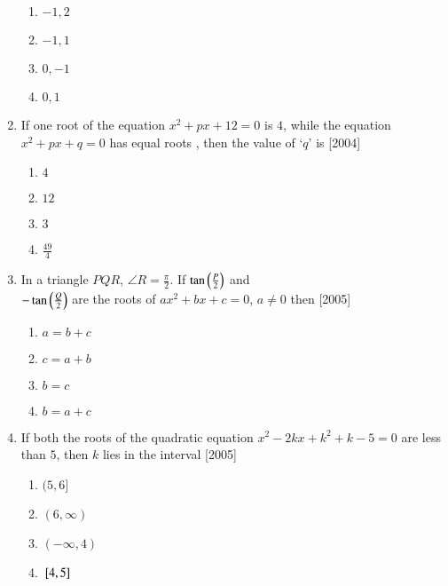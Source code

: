 \documentclass[journal,12pt,twocolumn]{IEEEtran}
\theoremstyle{remark}
\begin{document}
\begin{enumerate}
\begin{enumerate}

	\item  $-1,2$
	\item  $-1,1$
	\item  $0,-1$
	\item  $0,1$

\end{enumerate}

\item If one root of the equation $x^2 + px + 12 = 0$ is $4$, while the equation  $x^2 + px + q = 0$ has equal roots , then the value of `$q$' is
\hfill[2004]

\begin{enumerate}

	\item  $4$
	\item  $12$
	\item  $3$
	\item  $\frac{49}{4}$

\end{enumerate}

\item In a triangle $PQR$, $\angle R = \frac{\pi}{2}$. If $ \tan\left(\frac{P}{2}\right)$ and \\
	$- \tan\left(\frac{Q}{2}\right)$ are the roots of $ax^2 + bx + c = 0$, $a \neq 0$ then
\hfill[2005]

\begin{enumerate}


	\item  $a = b + c$
	\item  $c = a + b$
	\item  $b = c$
	\item  $b = a + c$

\end{enumerate}

\item If both the roots of the quadratic equation  $x^2 - 2kx + k^2 + k - 5 = 0$ are less than $5$, then $k$ lies in the interval
\hfill[2005]

\begin{enumerate}

	\item  $(5,6]$
	\item  $(6,\infty)$
	\item  $(- \infty,4)$
	\item  ${}\left[4,5\right]$

\end{enumerate}


\end{enumerate}
\end{document}
